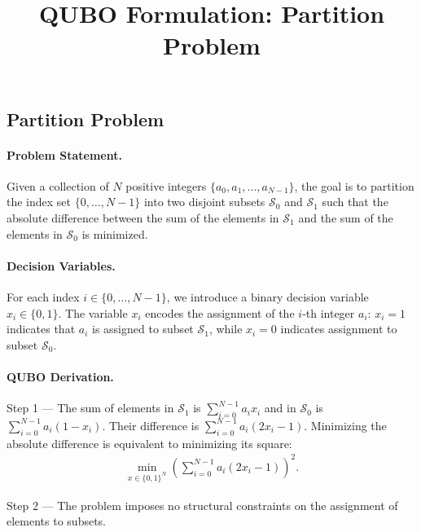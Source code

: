 \documentclass[12pt]{article}
\title{QUBO Formulation: Partition Problem}
\date{}
\begin{document}
\maketitle

\subsection*{Partition Problem}

\paragraph{Problem Statement.}
Given a collection of $N$ positive integers $\{a_0, a_1, \dots, a_{N-1}\}$, the goal is to partition the index set $\{0, \dots, N-1\}$ into two disjoint subsets $\mathcal{S}_0$ and $\mathcal{S}_1$ such that the absolute difference between the sum of the elements in $\mathcal{S}_1$ and the sum of the elements in $\mathcal{S}_0$ is minimized.

\paragraph{Decision Variables.}
For each index $i \in \{0, \dots, N-1\}$, we introduce a binary decision variable $x_i \in \{0, 1\}$. The variable $x_i$ encodes the assignment of the $i$-th integer $a_i$: $x_i = 1$ indicates that $a_i$ is assigned to subset $\mathcal{S}_1$, while $x_i = 0$ indicates assignment to subset $\mathcal{S}_0$.

\paragraph{QUBO Derivation.}
Step 1 --- The sum of elements in $\mathcal{S}_1$ is $\sum_{i=0}^{N-1} a_i x_i$ and in $\mathcal{S}_0$ is $\sum_{i=0}^{N-1} a_i (1 - x_i)$. Their difference is $\sum_{i=0}^{N-1} a_i (2x_i - 1)$. Minimizing the absolute difference is equivalent to minimizing its square:
\begin{align}
    \min_{x \in \{0,1\}^N} \left( \sum_{i=0}^{N-1} a_i (2x_i - 1) \right)^2.
\end{align}

Step 2 --- The problem imposes no structural constraints on the assignment of elements to subsets.
\end{document}

